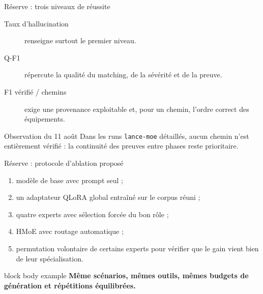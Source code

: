 \documentclass[aspectratio=169,10pt]{beamer}
\newcommand{\keymessage}[1]{%
  \begin{beamercolorbox}[rounded=true,sep=1.1ex,wd=\linewidth]{block body example}
    \centering\bfseries #1
  \end{beamercolorbox}
}
\begin{document}
\begin{frame}{Réserve : trois niveaux de réussite}
  \centering

  \vspace{1.2em}
  \begin{description}
    \item[Taux d'hallucination] renseigne surtout le premier niveau.
    \item[Q-F1] répercute la qualité du matching, de la sévérité et de la preuve.
    \item[F1 vérifié / chemins] exige une provenance exploitable et, pour un
      chemin, l'ordre correct des équipements.
  \end{description}

  \begin{alertblock}{Observation du 11 août}
    Dans les runs \texttt{lance-moe} détaillés, aucun chemin n'est entièrement
    vérifié : la continuité des preuves entre phases reste prioritaire.
  \end{alertblock}
\end{frame}

\begin{frame}{Réserve : protocole d'ablation proposé}
  \begin{enumerate}
    \item modèle de base avec prompt seul ;
    \item un adaptateur QLoRA global entraîné sur le corpus réuni ;
    \item quatre experts avec sélection forcée du bon rôle ;
    \item HMoE avec routage automatique ;
    \item permutation volontaire de certains experts pour vérifier que le gain
      vient bien de leur spécialisation.
  \end{enumerate}

  \vspace{0.8em}
  \keymessage{Même scénarios, mêmes outils, mêmes budgets de génération et répétitions équilibrées.}
\end{frame}
\end{document}

